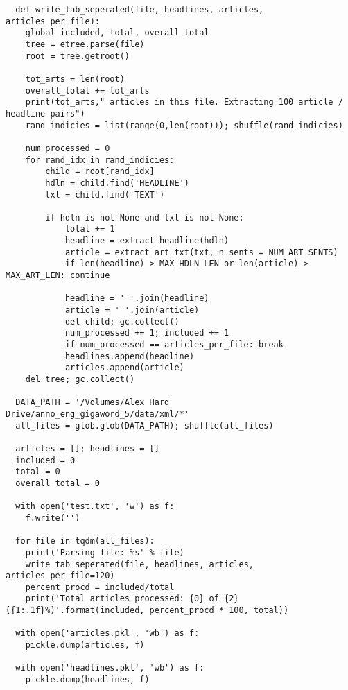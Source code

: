 \begin{lstlisting}
  def write_tab_seperated(file, headlines, articles, articles_per_file):
    global included, total, overall_total
    tree = etree.parse(file)
    root = tree.getroot()
    
    tot_arts = len(root)
    overall_total += tot_arts
    print(tot_arts," articles in this file. Extracting 100 article / headline pairs")
    rand_indicies = list(range(0,len(root))); shuffle(rand_indicies)
    
    num_processed = 0
    for rand_idx in rand_indicies:
        child = root[rand_idx]
        hdln = child.find('HEADLINE')
        txt = child.find('TEXT')

        if hdln is not None and txt is not None:
            total += 1
            headline = extract_headline(hdln)
            article = extract_art_txt(txt, n_sents = NUM_ART_SENTS)
            if len(headline) > MAX_HDLN_LEN or len(article) > MAX_ART_LEN: continue

            headline = ' '.join(headline)
            article = ' '.join(article)
            del child; gc.collect()
            num_processed += 1; included += 1
            if num_processed == articles_per_file: break
            headlines.append(headline)
            articles.append(article)
    del tree; gc.collect()

  DATA_PATH = '/Volumes/Alex Hard Drive/anno_eng_gigaword_5/data/xml/*'
  all_files = glob.glob(DATA_PATH); shuffle(all_files)

  articles = []; headlines = []
  included = 0
  total = 0
  overall_total = 0

  with open('test.txt', 'w') as f:
    f.write('')

  for file in tqdm(all_files):
    print('Parsing file: %s' % file)
    write_tab_seperated(file, headlines, articles, articles_per_file=120)
    percent_procd = included/total
    print('Total articles processed: {0} of {2} ({1:.1f}%)'.format(included, percent_procd * 100, total))

  with open('articles.pkl', 'wb') as f:
    pickle.dump(articles, f)

  with open('headlines.pkl', 'wb') as f:
    pickle.dump(headlines, f)
\end{lstlisting}